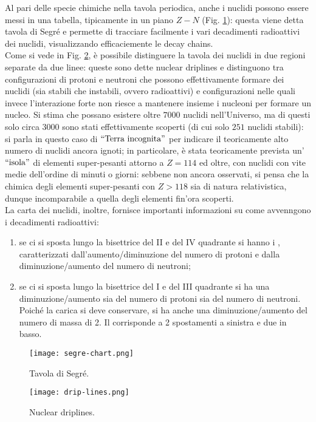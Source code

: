 Al pari delle specie chimiche nella tavola periodica, anche i nuclidi possono essere messi in una tabella, tipicamente in un piano $ Z - N $ (Fig. \ref{segre-chart}): questa viene detta tavola di Segré e permette di tracciare facilmente i vari decadimenti radioattivi dei nuclidi, visualizzando efficaciemente le decay chains.\\
Come si vede in Fig. \ref{drip-lines}, è possibile distinguere la tavola dei nuclidi in due regioni separate da due linee: queste sono dette nuclear driplines e distinguono tra configurazioni di protoni e neutroni che possono effettivamente formare dei nuclidi (sia stabili che instabili, ovvero radioattivi) e configurazioni nelle quali invece l'interazione forte non riesce a mantenere insieme i nucleoni per formare un nucleo. Si stima che possano esistere oltre $ 7000 $ nuclidi nell'Universo, ma di questi solo circa $ 3000 $ sono stati effettivamente scoperti (di cui solo $ 251 $ nuclidi stabili): si parla in questo caso di $ ``\text{Terra incognita}" $ per indicare il teoricamente alto numero di nuclidi ancora ignoti; in particolare, è stata teoricamente prevista un'$ ``\text{isola}" $ di elementi super-pesanti attorno a $ Z = 114 $ ed oltre, con nuclidi con vite medie dell'ordine di minuti o giorni: sebbene non ancora osservati, si pensa che la chimica degli elementi super-pesanti con $ Z > 118 $ sia di natura relativistica, dunque incomparabile a quella degli elementi fin'ora scoperti. \\
La carta dei nuclidi, inoltre, fornisce importanti informazioni su come avvenngono i decadimenti radioattivi:
\begin{enumerate}
	\item se ci si sposta lungo la bisettrice del II e del IV quadrante si hanno i , caratterizzati dall'aumento/diminuzione del numero di protoni e dalla diminuzione/aumento del numero di neutroni;
	\item se ci si sposta lungo la bisettrice del I e del III quadrante si ha una diminuzione/aumento sia del numero di protoni sia del numero di neutroni. Poiché la carica si deve conservare, si ha anche una diminuzione/aumento del numero di massa di 2. Il  corrisponde a 2 spostamenti a sinistra e due in basso.
  \end{enumerate}

\begin{figure}
  \centering
  \texttt{[image: segre-chart.png]}
  \caption{Tavola di Segré.}
  \label{segre-chart}
\end{figure}
\begin{figure}
  \centering
  \texttt{[image: drip-lines.png]}
  \caption{Nuclear driplines.}
  \label{drip-lines}
\end{figure}

